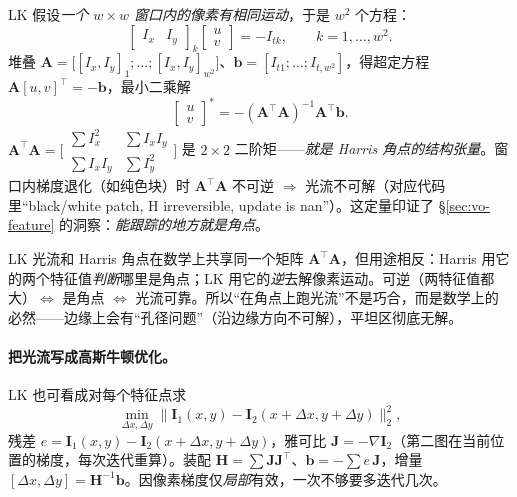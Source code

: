\begin{derivation}[LK 窗口假设与最小二乘解]
\label{thm:vo-lk-ls}
LK 假设\emph{一个 $w\times w$ 窗口内的像素有相同运动}\cite{gaoxiang2019slam14}，于是 $w^2$ 个方程：
\begin{equation}
  \begin{bmatrix}I_x & I_y\end{bmatrix}_k\begin{bmatrix}u\\v\end{bmatrix}=-I_{tk},\qquad k=1,\dots,w^2.
  \label{eq:vo-lk-window}
\end{equation}
堆叠 $\mathbf{A}=\big[[I_x,I_y]_1;\dots;[I_x,I_y]_{w^2}\big]$、$\mathbf{b}=[I_{t1};\dots;I_{t,w^2}]$，得超定方程 $\mathbf{A}[u,v]^\top=-\mathbf{b}$，最小二乘解
\begin{equation}
  \begin{bmatrix}u\\v\end{bmatrix}^*=-(\mathbf{A}^\top\mathbf{A})^{-1}\mathbf{A}^\top\mathbf{b}.
  \label{eq:vo-lk-ls}
\end{equation}
$\mathbf{A}^\top\mathbf{A}=\big[\begin{smallmatrix}\sum I_x^2&\sum I_xI_y\\\sum I_xI_y&\sum I_y^2\end{smallmatrix}\big]$ 是 $2\times2$ 二阶矩——\emph{就是 Harris 角点的结构张量}。窗口内梯度退化（如纯色块）时 $\mathbf{A}^\top\mathbf{A}$ 不可逆 $\Rightarrow$ 光流不可解（对应代码里“black/white patch, H irreversible, update is nan”）。这定量印证了 §\ref{sec:vo-feature} 的洞察：\emph{能跟踪的地方就是角点}。
\end{derivation}

\begin{insight}
LK 光流和 Harris 角点在数学上共享同一个矩阵 $\mathbf{A}^\top\mathbf{A}$，但用途相反：Harris 用它的两个特征值\emph{判断}哪里是角点；LK 用它的\emph{逆}去解像素运动。可逆（两特征值都大）$\Leftrightarrow$ 是角点 $\Leftrightarrow$ 光流可靠。所以“在角点上跑光流”不是巧合，而是数学上的必然——边缘上会有“孔径问题”（沿边缘方向不可解），平坦区彻底无解。
\end{insight}

\paragraph{把光流写成高斯牛顿优化\cite{gaoxiang2019slam14}。}LK 也可看成对每个特征点求
\begin{equation}
  \min_{\Delta x,\Delta y}\big\|\mathbf{I}_1(x,y)-\mathbf{I}_2(x+\Delta x,y+\Delta y)\big\|_2^2,
  \label{eq:vo-lk-gn}
\end{equation}
残差 $e=\mathbf{I}_1(x,y)-\mathbf{I}_2(x+\Delta x,y+\Delta y)$，雅可比 $\mathbf{J}=-\nabla\mathbf{I}_2$（第二图在当前位置的梯度，每次迭代重算）。装配 $\mathbf{H}=\sum\mathbf{J}\mathbf{J}^\top$、$\mathbf{b}=-\sum e\,\mathbf{J}$，增量 $[\Delta x,\Delta y]=\mathbf{H}^{-1}\mathbf{b}$。因像素梯度仅\emph{局部}有效，一次不够要多迭代几次。

